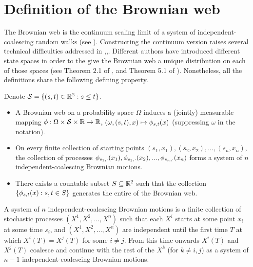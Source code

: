 {
\section{Definition of the Brownian web}
\label{sec:brownian-web-definition}

The Brownian web is the continuum scaling limit of a system of
independent-coalescing random walks (see
\cite{tsirelson-lecture-course}).  Constructing the
continuum version raises several technical difficulties addressed in
\cite{fontes-et-al},\cite{norris-turner},\cite{toth-werner}.
Different authors have introduced different state spaces in order to
the give the Brownian web a unique distribution on each of those
spaces (see Theorem 2.1 of \cite{fontes-et-al}, and Theorem 5.1 of
\cite{norris-turner}).
Nonetheless, all the
definitions share the following defining property.

\begin{definition}
\label{def:web}
\newcommand{\simplex}{\mathcal{S}}

  Denote $\simplex=\{(s, t) \in \R^2 : s \le t\}$.
\begin{itemize}
  \item
  A Brownian web on a probability space $\Omega$ induces a (jointly)
  measurable mapping $\webnoargs : \Omega \cross \simplex \cross \R
  \to \R$, $(\omega, (s, t), x) \mapsto \phi_{{s},{t}}(x)$ (suppressing
  $\omega$ in the notation).

  \item
  On every finite collection of
  starting points $(s_1, x_1),(s_2, x_2),...,(s_n, x_n)$, the
  collection of processes $\phi_{{s_1},{\cdot}}(x_1),
  \phi_{{s_2},{\cdot}}(x_2),...,\phi_{{s_n},{\cdot}}(x_n)$
  forms a system of $n$ independent-coalescing Brownian motions.

  \item
  There exists a countable subset $S \subseteq \mathbb{R}^2$ such that the
  collection $\{\phi_{{s},{t}}(x) : s,t \in S\}$ generates the entire
  \sigfield{} of the Brownian web.
\end{itemize}

  \newcommand{\bm}[1]{X^{#1}}
  A system of $n$ independent-coalescing Brownian motions is a finite
  collection of stochastic processes $(\bm{1}, \bm{2},...,\bm{n})$ such that
  each $\bm{i}$ starts at some point $x_i$ at some time $s_i$, and $(\bm{1},
  \bm{2},...,\bm{n})$ are independent until the first time $T$ at which
  $\bm{i}(T)=\bm{j}(T)$ for some $i\neq j$. From this time onwards $\bm{i}(T)$
  and $\bm{j}(T)$ coalesce and continue with the rest of the $\bm{k}$ (for
  $k\neq i,j$) as a system of $n-1$ independent-coalescing Brownian motions.
\end{definition}

}
